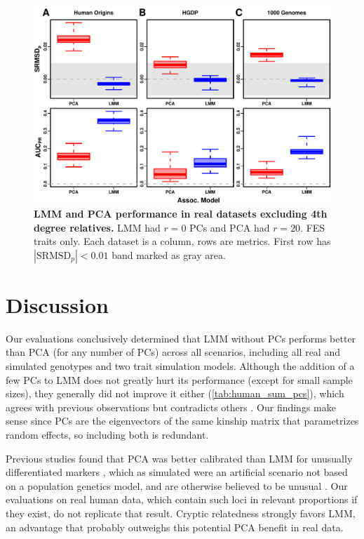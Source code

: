 \documentclass[11pt]{article}
\newcommand{\rmsd}{\text{SRMSD}_p}
\begin{document}
\begin{figure}[bp!]
  \centering
  \includegraphics[width=\textwidth]{fes/rmsd-auc_king-cutoff-4.pdf}
  \caption{
    {\bf LMM and PCA performance in real datasets excluding 4th degree relatives.}
    LMM had $r=0$ PCs and PCA had $r=20$.
    FES traits only.
    Each dataset is a column, rows are metrics.
    First row has $|\rmsd| < 0.01$ band marked as gray area.
  }
  \label{fig:king_cutoff}
\end{figure}


\section{Discussion}

Our evaluations conclusively determined that LMM without PCs performs better than PCA (for any number of PCs) across all scenarios, including all real and simulated genotypes and two trait simulation models.
Although the addition of a few PCs to LMM does not greatly hurt its performance (except for small sample sizes), they generally did not improve it either (\cref{tab:human_sum_pcs}), which agrees with previous observations \citep{liu_controlling_2011} but contradicts others \citep{zhao_arabidopsis_2007, price_new_2010}.
Our findings make sense since PCs are the eigenvectors of the same kinship matrix that parametrizes random effects, so including both is redundant.

Previous studies found that PCA was better calibrated than LMM for unusually differentiated markers \citep{price_new_2010, wu_comparison_2011, yang_advantages_2014}, which as simulated were an artificial scenario not based on a population genetics model, and are otherwise believed to be unusual \citep{sul_mixed_2013, price_response_2013}.
Our evaluations on real human data, which contain such loci in relevant proportions if they exist, do not replicate that result.
Cryptic relatedness strongly favors LMM, an advantage that probably outweighs this potential PCA benefit in real data.
\end{document}
